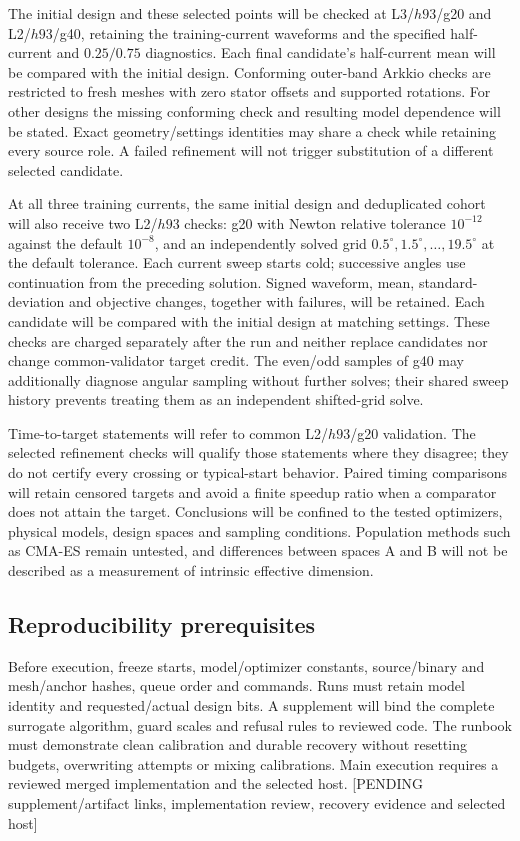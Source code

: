 The initial design and these selected points will be checked at L3/$h93$/g20
and L2/$h93$/g40, retaining the training-current waveforms and the specified
half-current and $0.25/0.75$ diagnostics. Each final candidate's half-current
mean will be compared with the initial design. Conforming outer-band Arkkio checks
are restricted to fresh meshes with zero stator offsets and supported
rotations. For other designs the missing conforming check and resulting
model dependence will be stated. Exact geometry/settings identities may
share a check while retaining every source role. A failed refinement will
not trigger substitution of a different selected candidate.

At all three training currents, the same initial design and deduplicated
cohort will also receive two L2/$h93$ checks: g20 with Newton relative
tolerance $10^{-12}$ against the default $10^{-8}$, and an independently
solved grid $0.5^\circ,1.5^\circ,\ldots,19.5^\circ$ at the default tolerance.
Each current sweep starts cold; successive angles use continuation from
the preceding solution. Signed waveform, mean, standard-deviation and
objective changes, together with failures, will be retained. Each candidate
will be compared with the initial design at matching settings. These checks
are charged separately after the run and neither replace candidates nor
change common-validator target credit. The even/odd samples of g40 may
additionally diagnose angular sampling without further solves; their shared
sweep history prevents treating them as an independent shifted-grid solve.

Time-to-target statements will refer to common L2/$h93$/g20 validation.
The selected refinement checks will qualify those statements where they
disagree; they do not certify every crossing or typical-start behavior.
Paired timing comparisons will retain censored targets and avoid a finite
speedup ratio when a comparator does not attain the target. Conclusions will
be confined to the tested optimizers, physical models, design spaces and
sampling conditions. Population methods such as CMA-ES remain untested, and
differences between spaces A and B will not be described as a measurement of
intrinsic effective dimension.


\subsection{Reproducibility prerequisites}

Before execution, freeze starts, model/optimizer constants, source/binary and
mesh/anchor hashes, queue order and commands. Runs must retain model identity
and requested/actual design bits. A supplement will bind the complete
surrogate algorithm, guard scales and refusal rules to reviewed code. The
runbook must demonstrate clean calibration and durable recovery without
resetting budgets, overwriting attempts or mixing calibrations. Main execution
requires a reviewed merged implementation and the selected host.
[PENDING supplement/artifact links, implementation review, recovery evidence
and selected host]
